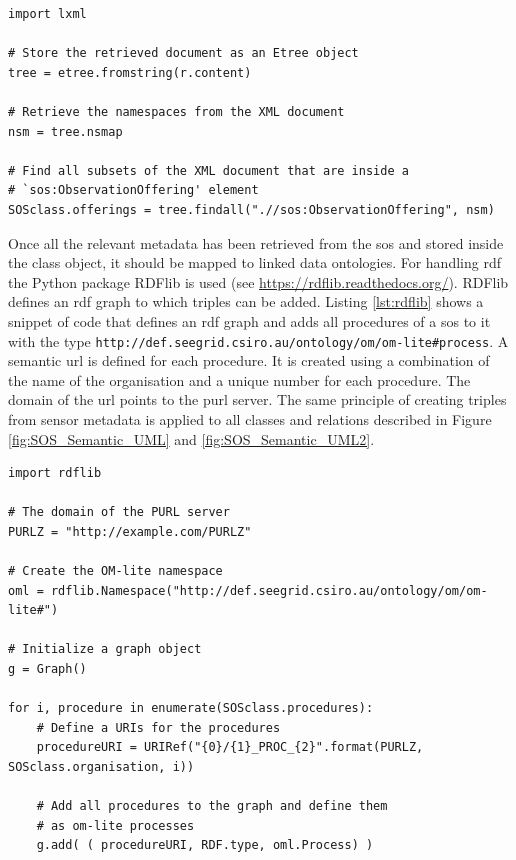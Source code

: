 \begin{lstlisting}[float,caption={Creating an Etree object from an XML response document using Python's LXML library}, label={lst:LXML}]
import lxml

# Store the retrieved document as an Etree object
tree = etree.fromstring(r.content)

# Retrieve the namespaces from the XML document
nsm = tree.nsmap

# Find all subsets of the XML document that are inside a   
# `sos:ObservationOffering' element 
SOSclass.offerings = tree.findall(".//sos:ObservationOffering", nsm)

\end{lstlisting}   
\begin{sloppypar}
Once all the relevant metadata has been retrieved from the \ac{sos} and stored inside the class object, it should be mapped to linked data ontologies. For handling \ac{rdf} the Python package RDFlib is used (see \url{https://rdflib.readthedocs.org/}).  RDFlib defines an \ac{rdf} graph to which triples can be added. Listing \ref{lst:rdflib} shows a snippet of code that defines an \ac{rdf} graph and adds all procedures of a \ac{sos} to it with the type \texttt{http://def.seegrid.csiro.au/ontology/om/om-lite\#process}. A semantic \ac{url} is defined for each procedure. It is created using a combination of the name of the organisation and a unique number for each procedure. The domain of the \ac{url} points to the \ac{purl} server. The same principle of creating triples from sensor metadata is applied to all classes and relations described in Figure \ref{fig:SOS_Semantic_UML} and \ref{fig:SOS_Semantic_UML2}. 
\end{sloppypar}


\begin{lstlisting}[float,caption={Creating an RDF graph object with the Python package RDFlib}, label={lst:rdflib}]
import rdflib

# The domain of the PURL server
PURLZ = "http://example.com/PURLZ"

# Create the OM-lite namespace 
oml = rdflib.Namespace("http://def.seegrid.csiro.au/ontology/om/om-lite#")

# Initialize a graph object
g = Graph()

for i, procedure in enumerate(SOSclass.procedures):
	# Define a URIs for the procedures
	procedureURI = URIRef("{0}/{1}_PROC_{2}".format(PURLZ, SOSclass.organisation, i))
	
	# Add all procedures to the graph and define them   
	# as om-lite processes
	g.add( ( procedureURI, RDF.type, oml.Process) )

\end{lstlisting}  

